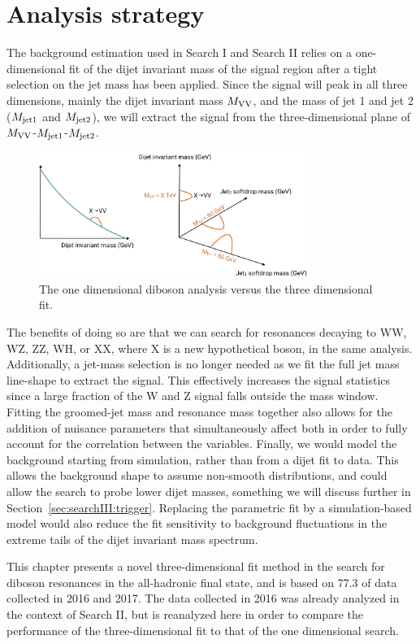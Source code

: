\section{Analysis strategy}
The background estimation used in Search I and Search II relies on a one-dimensional fit of the dijet invariant mass of the signal region after a tight selection on the jet mass has been applied. Since the signal will peak in all three dimensions, mainly the dijet invariant mass $M_{\rm VV}$, and the mass of jet 1 and jet 2 ($M_{\rm jet1}$ and $M_{\rm jet2}$), we will extract the signal from the three-dimensional plane of $M_{\rm VV}$-$M_{\rm jet1}$-$M_{\rm jet2}$.
\begin{figure}[h!] 
    \centering
    \includegraphics[width=0.79\textwidth]{figures/analysis/search3/misc/1Dvs3D.png}
    \caption{The one dimensional diboson analysis versus the three dimensional fit.}
    \label{fig:searchIII:1Dvs3D}
\end{figure}
The benefits of doing so are that we can search for resonances decaying to WW, WZ, ZZ, WH, or XX, where X is a new hypothetical boson, in the same analysis. Additionally, a jet-mass selection is no longer needed as we fit the full jet mass line-shape to extract the signal. This effectively increases the signal statistics since a large fraction of the W and Z signal falls outside the mass window. Fitting the groomed-jet mass and resonance mass together also allows for the addition of nuisance parameters that simultaneously affect both in order to fully account for the correlation between the variables. Finally, we would model the background starting from simulation, rather than from a dijet fit to data. This allows the background shape to assume non-smooth distributions, and could allow the search to probe lower dijet masses, something we will discuss further in Section~\ref{sec:searchIII:trigger}. Replacing the parametric fit by a simulation-based model would also reduce the fit sensitivity to background fluctuations in the extreme tails of the dijet invariant mass spectrum. \par
This chapter presents a novel three-dimensional fit method in the search for diboson resonances in the all-hadronic final state, and is based on 77.3 \fbinv of data collected in 2016 and 2017. The data collected in 2016 was already analyzed in the context of Search II, but is reanalyzed here in order to compare the performance of the three-dimensional fit to that of the one dimensional search.

